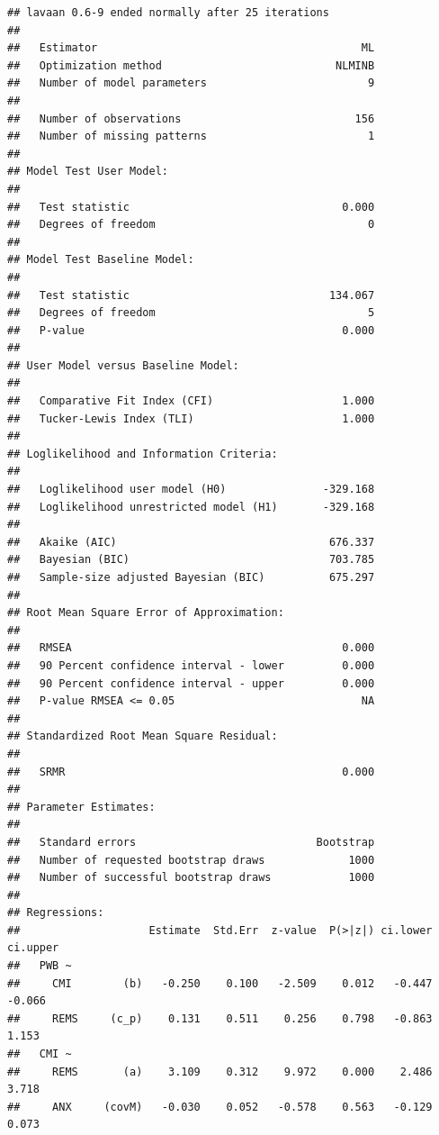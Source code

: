 \documentclass[
]{book}
\begin{document}
\begin{verbatim}
## lavaan 0.6-9 ended normally after 25 iterations
## 
##   Estimator                                         ML
##   Optimization method                           NLMINB
##   Number of model parameters                         9
##                                                       
##   Number of observations                           156
##   Number of missing patterns                         1
##                                                       
## Model Test User Model:
##                                                       
##   Test statistic                                 0.000
##   Degrees of freedom                                 0
## 
## Model Test Baseline Model:
## 
##   Test statistic                               134.067
##   Degrees of freedom                                 5
##   P-value                                        0.000
## 
## User Model versus Baseline Model:
## 
##   Comparative Fit Index (CFI)                    1.000
##   Tucker-Lewis Index (TLI)                       1.000
## 
## Loglikelihood and Information Criteria:
## 
##   Loglikelihood user model (H0)               -329.168
##   Loglikelihood unrestricted model (H1)       -329.168
##                                                       
##   Akaike (AIC)                                 676.337
##   Bayesian (BIC)                               703.785
##   Sample-size adjusted Bayesian (BIC)          675.297
## 
## Root Mean Square Error of Approximation:
## 
##   RMSEA                                          0.000
##   90 Percent confidence interval - lower         0.000
##   90 Percent confidence interval - upper         0.000
##   P-value RMSEA <= 0.05                             NA
## 
## Standardized Root Mean Square Residual:
## 
##   SRMR                                           0.000
## 
## Parameter Estimates:
## 
##   Standard errors                            Bootstrap
##   Number of requested bootstrap draws             1000
##   Number of successful bootstrap draws            1000
## 
## Regressions:
##                    Estimate  Std.Err  z-value  P(>|z|) ci.lower ci.upper
##   PWB ~                                                                 
##     CMI        (b)   -0.250    0.100   -2.509    0.012   -0.447   -0.066
##     REMS     (c_p)    0.131    0.511    0.256    0.798   -0.863    1.153
##   CMI ~                                                                 
##     REMS       (a)    3.109    0.312    9.972    0.000    2.486    3.718
##     ANX     (covM)   -0.030    0.052   -0.578    0.563   -0.129    0.073

\end{verbatim}
\end{document}
